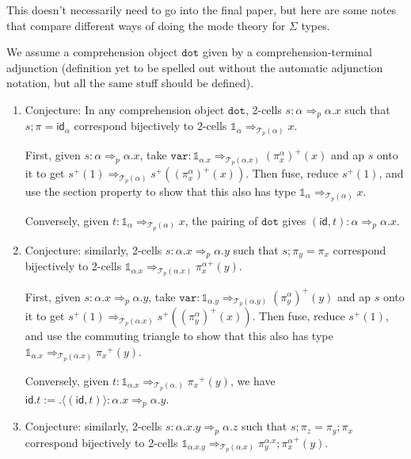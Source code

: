 \documentclass[10pt]{article}
\theoremstyle{definition}
\newcommand{\tcell}{\Rightarrow}
\newcommand{\id}{\mathsf{id}}
\newcommand\TrPlus[2]{\ensuremath{{#1}^+(#2)}}
\newcommand\El[2]{\mathcal{T}_{#1}(#2)}
\newcommand\ap[2]{\ensuremath{#1 \langle #2 \rangle }}
\newcommand{\tdot}{\ensuremath{\mathtt{dot}}}
\newcommand\One{\ensuremath{\mathds{1}}}
\newcommand\mtt[1]{\mathtt{#1}}
\begin{document}
\iffalse
{}

This doesn't necessarily need to go into the final paper, but here are
some notes that compare different ways of doing the mode theory for
$\Sigma$ types.

We assume a comprehension object $\tdot$ given by a
comprehension-terminal adjunction (definition yet to be spelled out
without the automatic adjunction notation, but all the same stuff should
be defined).


\begin{enumerate}

\item \label{sigma:total-to-fiber0} Conjecture: In any comprehension
  object $\tdot$, 2-cells $s : \alpha \tcell_p \alpha.x$ such that $s;\pi
  = \id_\alpha$ correspond bijectively to 2-cells $\One_\alpha
  \tcell_{\El{p}{\alpha}} x$.

  First, given $s : \alpha \tcell_p \alpha.x$, take $\mtt{var} : \One_{\alpha.x}
  \tcell_{\El{p}{\alpha.x}} \TrPlus{(\pi^\alpha_x)}{x}$ and ap $s$ onto
  it to get $\TrPlus{s}{1} \tcell_{\El{p}{\alpha}}
  \TrPlus{s}{\TrPlus{(\pi^\alpha_x)}{x}}$.  Then fuse, reduce
  $\TrPlus{s}{1}$, and use the section property to show that this also
  has type
  $\One_\alpha \tcell_{\El{p}{\alpha}} x$.

  Conversely, given $t : \One_\alpha \tcell_{\El{p}{\alpha}} x$,
  the pairing of $\tdot$ gives $(\id, t) : \alpha \tcell_p \alpha.x$.

\item \label{sigma:total-to-fiber1} Conjecture: similarly, 2-cells $s :
  \alpha.x \tcell_p \alpha.y$ such that $s;\pi_y = \pi_x$ correspond
  bijectively to 2-cells $\One_{\alpha.x} \tcell_{\El{p}{\alpha.x}}
  \TrPlus{\pi^\alpha_x}{y}$.

  First, given $s : \alpha.x \tcell_p \alpha.y$, take $\mtt{var} :
  \One_{\alpha.y} \tcell_{\El{p}{\alpha.y}} \TrPlus{(\pi^\alpha_y)}{y}$ and
  ap $s$ onto it to get $\TrPlus{s}{1} \tcell_{\El{p}{\alpha.x}}
  \TrPlus{s}{\TrPlus{(\pi^\alpha_y)}{x}}$.  Then fuse, reduce
  $\TrPlus{s}{1}$, and use the commuting triangle to show that this also
  has type $\One_{\alpha.x} \tcell_{\El{p}{\alpha.x}} \TrPlus{\pi_x} y$.

  Conversely, given $t : \One_{\alpha.x} \tcell_{\El{p}{\alpha.}}
  \TrPlus{\pi_x} y$, we have $\id.t := \ap{.}{(\id, t)} : \alpha.x \tcell_p \alpha.y$.

\item \label{sigma:total-to-fiber2} Conjecture: similarly, 2-cells $s :
  \alpha.x.y \tcell_p \alpha.z$ such that $s;\pi_z = \pi_y;\pi_x$
  correspond bijectively to 2-cells $\One_{\alpha.x.y}
  \tcell_{\El{p}{\alpha.x}} \TrPlus{\pi^{\alpha.x}_y;\pi^\alpha_x}{y}$.


\end{enumerate}
\end{document}
